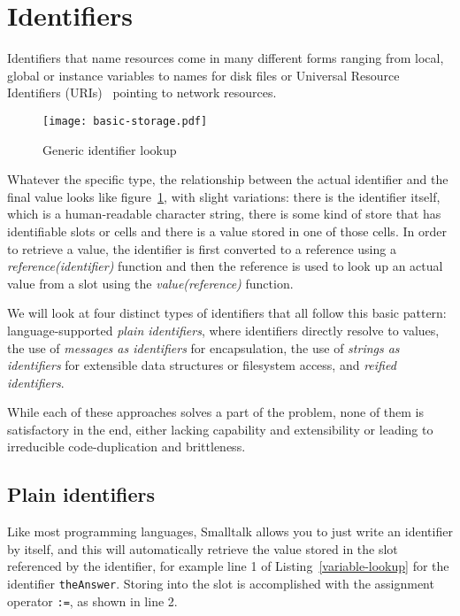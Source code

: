 \documentclass[preprint,authoryear]{llncs}
\begin{document}





\section{Identifiers}
\label{identifiers}


Identifiers that name resources come in many different forms ranging from local,
global or instance variables to names for disk files or Universal Resource Identifiers (URIs)~\cite{rfc3986} pointing to network resources.

\begin{figure}[htbp]
\begin{center}
\texttt{[image: basic-storage.pdf]}
\caption{Generic identifier lookup}
\label{identifier-eval}
\end{center}
\end{figure}

Whatever the specific type, the relationship between the actual identifier and the
final value looks like figure~\ref{identifier-eval}, with slight variations:   there is 
the identifier itself, which is a human-readable character string, there is some kind
of store that has identifiable slots or cells and there is a value stored in one of those
cells.   In order to retrieve a value, the identifier is first converted to a reference using a
 \emph{reference(identifier)} function and then the reference is used to look up an actual
value from a slot using the \emph{value(reference)} function.


We will look at four distinct types of identifiers that all follow this basic pattern:  language-supported 
\emph{plain identifiers}, where identifiers directly resolve to values, the use of \emph{messages as identifiers} 
for encapsulation, the use of \emph{strings as identifiers} for extensible data structures or filesystem access, and
\emph{reified identifiers}.

 While each of these approaches solves a part of the problem,
none of them is satisfactory in the end, either lacking capability and extensibility or leading to
irreducible code-duplication and brittleness.

\subsection{Plain identifiers}
\label{direct-reference}
Like most programming languages, Smalltalk allows you to just write 
an identifier by itself, and this will automatically retrieve the value stored in the slot referenced by the identifier, for
example line 1 of Listing~\ref{variable-lookup} for the identifier {\tt theAnswer}.
Storing into the slot is accomplished with
the assignment operator {\tt :=}, as shown in line 2.
\end{document}
